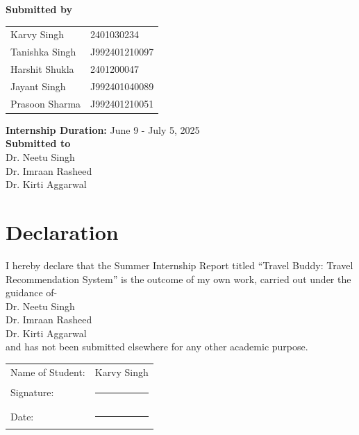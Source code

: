 \documentclass[12pt,a4paper]{report}
\begin{document}
\begin{titlepage}
  {\small
  \textbf{Submitted by}\\
	\begin{tabular}{ll}
		Karvy Singh      & 2401030234 \\
		Tanishka Singh     & J992401210097 \\
		Harshit Shukla  & 2401200047 \\ 
        Jayant Singh & J992401040089 \\
        Prasoon Sharma & J992401210051 \\
	\end{tabular}
    \vspace{0.5cm}
    }

    {\small
    \textbf{Internship Duration:} June 9 - July 5, 2025 \\
    \vspace{0.5cm}
    \textbf{Submitted to}\\
    Dr. Neetu Singh \\
    Dr. Imraan Rasheed  \\
    Dr. Kirti Aggarwal \\
    }

\end{titlepage}

\newpage
\thispagestyle{empty}
\section*{Declaration}

I hereby declare that the Summer Internship Report titled “Travel Buddy: Travel Recommendation System” is the outcome of my own work, carried out under the guidance of-\\
Dr. Neetu Singh\\	
Dr. Imraan Rasheed  \\
Dr. Kirti Aggarwal  \\
and has not been submitted elsewhere for any other academic purpose.

\vspace{3cm}
\noindent
\begin{tabular}{@{}l@{\quad}l}
  Name of Student: & Karvy Singh \\
  Signature:       & \rule{4cm}{0.4pt} \\
  Date:            & \rule{4cm}{0.4pt}
\end{tabular}

\newpage
\thispagestyle{empty}
\end{document}
